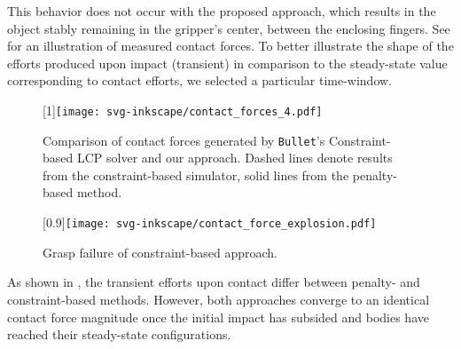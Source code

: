 This behavior does not occur with the proposed approach, which results in the object stably remaining in the gripper's center, between the enclosing fingers. See  for an illustration of measured contact forces. To better illustrate the shape of the efforts produced upon impact (transient) in comparison to the steady-state value corresponding to contact efforts, we selected a particular time-window.
%
\begin{figure}
	\centering
	\scalebox{1}[1]{\texttt{[image: svg-inkscape/contact\_forces\_4.pdf]}}
	\vspace{-0.7cm}
	\caption{Comparison of contact forces generated by \texttt{Bullet}'s Constraint-based LCP solver and our approach. Dashed lines denote results from the constraint-based simulator, solid lines from the penalty-based method.}
	\label{fig:grasp_throw}
\end{figure}
%
\begin{figure}
	\centering
	\scalebox{1}[0.9]{\texttt{[image: svg-inkscape/contact\_force\_explosion.pdf]}}
	\caption{Grasp failure of constraint-based approach.}
	\label{fig:grasp_explosion}
\end{figure}
%
As shown in , the transient efforts upon contact differ between penalty- and constraint-based methods. However, both approaches converge to an identical contact force magnitude once the initial impact has subsided and bodies have reached their steady-state configurations.

